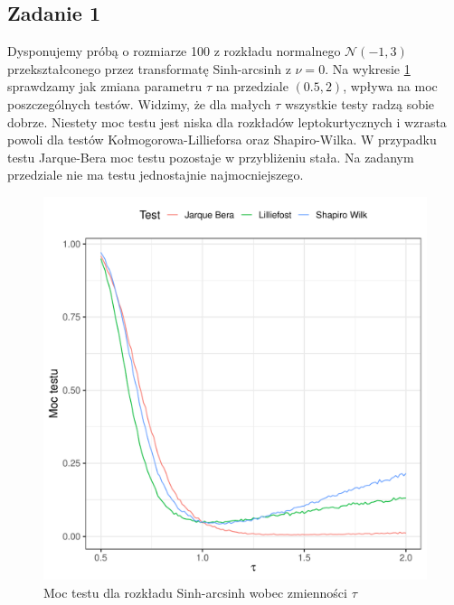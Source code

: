 \documentclass{article}
\theoremstyle{break}
\begin{document}
	\subsection*{Zadanie 1}
	Dysponujemy próbą o rozmiarze 100 z rozkładu normalnego $\mathcal{N}(-1,3)$ przekształconego przez transformatę Sinh-arcsinh z $\nu = 0$. Na wykresie \ref{fig:z1} sprawdzamy jak zmiana parametru $\tau$ na przedziale $(0.5,2)$, wpływa na moc poszczególnych testów. Widzimy, że dla małych $\tau$ wszystkie testy radzą sobie dobrze. Niestety moc testu jest niska dla rozkładów leptokurtycznych i wzrasta powoli dla testów Kołmogorowa-Lillieforsa oraz Shapiro-Wilka. W przypadku testu Jarque-Bera moc testu pozostaje w przybliżeniu stała. Na zadanym przedziale nie ma testu jednostajnie najmocniejszego.
	\begin{figure}[H]
		\begin{center}
			\includegraphics[scale=0.75]{zad1.pdf}
			\caption{Moc testu dla rozkładu Sinh-arcsinh wobec zmienności $\tau$}
			\label{fig:z1}
		\end{center}
	\end{figure}
\end{document}
